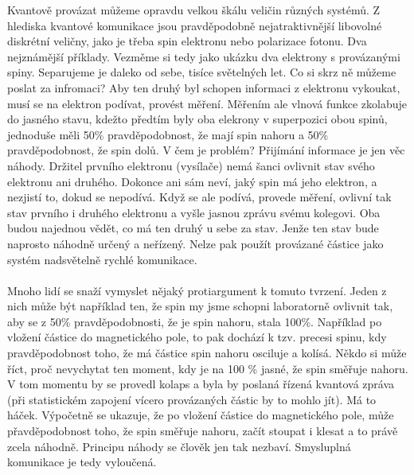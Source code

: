 \documentclass{../../../../style/mkimain}
\begin{document}
\noindent{}
\klein
Kvantově provázat můžeme opravdu velkou škálu veličin různých systémů.
Z hlediska kvantové komunikace jsou pravděpodobně nejatraktivnější libovolné diskrétní veličny,
jako je třeba spin elektronu nebo polarizace fotonu. Dva nejznámější příklady.
Vezměme si tedy jako ukázku dva elektrony s provázanými spiny. Separujeme je daleko od sebe, tisíce světelných let.
Co si skrz ně můžeme poslat za infromaci? Aby ten druhý byl schopen informaci z elektronu vykoukat,
musí se na elektron podívat, provést měření. Měřením ale vlnová funkce zkolabuje do jasného stavu,
kdežto předtím byly oba elekrony v superpozici obou spinů, jednoduše měli 50\% pravděpodobnost, že mají spin nahoru
a 50\% pravděpodobnost, že spin dolů. V čem je problém? Přijímání informace je jen věc náhody. Držitel prvního elektronu (vysílače)
nemá šanci ovlivnit stav svého elektronu ani druhého. Dokonce ani sám neví, jaký spin má jeho elektron, a nezjistí to, dokud se nepodívá.
Když se ale podívá, provede měření, ovlivní tak stav prvního i druhého elektronu a vyšle jasnou zprávu svému kolegovi.
Oba budou najednou vědět, co má ten druhý u sebe za stav. Jenže ten stav bude naprosto náhodně určený a neřízený.
Nelze pak použít provázané částice jako systém nadsvětelně rychlé komunikace.
\\\\
Mnoho lidí se snaží vymyslet nějaký protiargument k tomuto tvrzení. Jeden z nich může být například ten,
že spin my jsme schopni laboratorně ovlivnit tak, aby se z 50\% pravděpodobnosti, že je spin nahoru, stala 100\%.
Například po vložení částice do magnetického pole, to pak dochází k tzv. precesi spinu, kdy pravděpodobnost toho,
že má částice spin nahoru osciluje a kolísá. Někdo si může říct, proč nevychytat ten moment, kdy je na 100 \% jasné, že spin směřuje nahoru.
V tom momentu by se provedl kolaps a byla by poslaná řízená kvantová zpráva (při statistickém zapojení vícero provázaných částic by to mohlo jít). Má to háček. Výpočetně se ukazuje,
že po vložení částice do magnetického pole, může přavděpodobnost toho, že spin směřuje nahoru, začít stoupat i klesat 
a to právě zcela náhodně. Principu náhody se člověk jen tak nezbaví. Smysluplná komunikace je tedy vyloučená.
\end{document}
